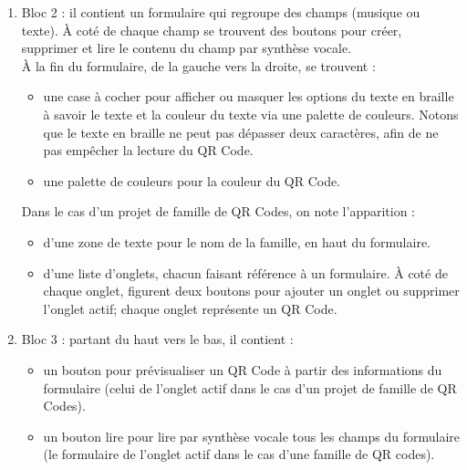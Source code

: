 \begin{enumerate}
\newpage
\item Bloc 2 : il contient un formulaire qui regroupe des champs (musique ou texte). À coté de chaque champ se trouvent des boutons pour créer, supprimer et lire le contenu du champ par synthèse vocale.\\
À la fin du formulaire, de la gauche vers la droite, se trouvent :
	\begin{itemize}
	\item une case à cocher pour afficher ou masquer les options du texte en braille à savoir le texte et la couleur du texte via une palette de couleurs. Notons que le texte en braille ne peut pas dépasser deux caractères, afin de ne pas empêcher la lecture du QR Code.
	\item une palette de couleurs pour la couleur du QR Code.
	\end{itemize}
Dans le cas d'un projet de famille de QR Codes, on note l'apparition :
	\begin{itemize}
	\item d'une zone de texte pour le nom de la famille, en haut du formulaire.
	\item d'une liste d'onglets, chacun faisant référence à un formulaire. À coté de chaque onglet, figurent deux boutons pour ajouter un onglet ou supprimer l'onglet actif; chaque onglet représente un QR Code.
	\end{itemize}
	
\item Bloc 3 : partant du haut vers le bas, il contient : 
	\begin{itemize}
	\item un bouton pour prévisualiser un QR Code à partir des informations du formulaire (celui de l'onglet actif dans le cas d'un projet de famille de QR Codes).
	\item un bouton lire pour lire par synthèse vocale tous les champs du formulaire (le formulaire de l'onglet actif dans le cas d'une famille de QR codes).
	\end{itemize}

\end{enumerate}
